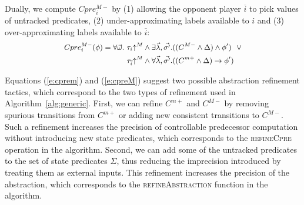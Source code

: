 \documentclass[a4paper,twoside,openright,11pt]{book}
\newcommand{\abstractM}[1]{#1\mathord{\uparrow^M}}
\newcommand{\vect}[1]{\vec{#1}}
\theoremstyle{definition}
\begin{document}
Dually, we compute $Cpre_i^{M-}$ by (1) allowing the opponent 
player $\overline{i}$ to pick values of untracked predicates, (2) 
under-approximating labels available to $i$ and (3) 
over-approximating labels available to $\overline{i}$:
\begin{equation}
    \small
    \label{e:cpreM}
\begin{aligned}
    Cpre_i^{M-}(\phi) = \forall \vect{\omega}.~&\abstractM{\tau_i}         \land \exists \vect{\lambda},\vect{\sigma'}. ((C^{M-} \land \Delta) \land \phi')
                                             ~~\lor\\
                                               &\abstractM{\tau_{\overline{i}}} \land \forall \vect{\lambda},\vect{\sigma'}. ((C^{m+} \land \Delta) \rightarrow \phi')
\end{aligned}
\end{equation}

Equations (\ref{e:cprem}) and (\ref{e:cpreM}) suggest two possible 
abstraction refinement tactics, which correspond to the two types 
of refinement used in Algorithm~\ref{alg:generic}.  First, we can 
refine $C^{m+}$ and $C^{M-}$ by removing spurious transitions from 
$C^{m+}$ or adding new consistent transitions to $C^{M-}$.  Such a 
refinement increases the precision of controllable predecessor 
computation without introducing new state predicates, which 
corresponds to the \textsc{refineCpre} operation in the algorithm.  
Second, we can add some of the untracked predicates to the set of 
state predicates $\Sigma$, thus reducing the imprecision 
introduced by treating them as external inputs.  This refinement 
increases the precision of the abstraction, which corresponds to 
the \textsc{refineAbstraction} function in the algorithm.
\end{document}

